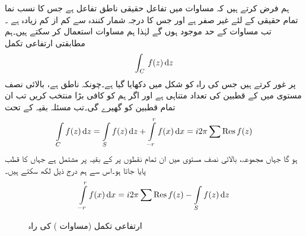 ہم فرض کرتے ہیں کہ مساوات  میں تفاعل  حقیقی ناطق تفاعل ہے جس کا نسب نما تمام حقیقی  کے لئے غیر صفر ہے اور جس کا درجہ شمار کنندہ  سے کم از کم  زیادہ ہے ۔تب  مساوات  کے حد موجود ہوں گے لہٰذا ہم  مساوات  استعمال کر سکتے ہیں۔ہم مطابقتی ارتفاعی تکمل
\begin{align}\label{مساوات_بقیہ_تکمل_ارتفاعی}
\int_C\, f(z)\dif z
\end{align}
پر غور کرتے ہیں جس کی راہ  کو شکل  میں دکھایا گیا ہے۔چونکہ  ناطق ہے، بالائی نصف مستوی میں  کے قطبین کی تعداد متناہی ہے اور اگر ہم  کو کافی بڑا منتخب کریں تب  ان تمام قطبین کو گھیرے گی۔تب مسئلہ بقیہ کے تحت
\begin{align*}
\int\limits_C f(z)\dif z=\int\limits_S f(z)\dif z+\int\limits_{-r}^{r} f(x)\dif x=i2\pi\sum \Res f(z)
\end{align*}
ہو گا جہاں مجموعہ، بالائی نصف مستوی میں ان تمام نقطوں پر  کے  بقیہ پر مشتمل  ہے جہاں  کا قطب پایا جاتا ہو۔اس سے ہم درج ذیل لکھ سکتے ہیں۔
\begin{align}\label{مساوات_بقیہ_ناطق_اور_مجموعہ_بقیہ}
\int\limits_{-r}^{r}f(x)\dif x=i2\pi\sum \Res f(z)-\int\limits_S f(z)\dif z
\end{align}
%
\begin{figure}
\centering
{}
\caption{ارتفاعی تکمل (مساوات ) کی راہ}
\label{شکل_مساوات_بقیہ_تکمل_ارتفاعی}
\end{figure}

